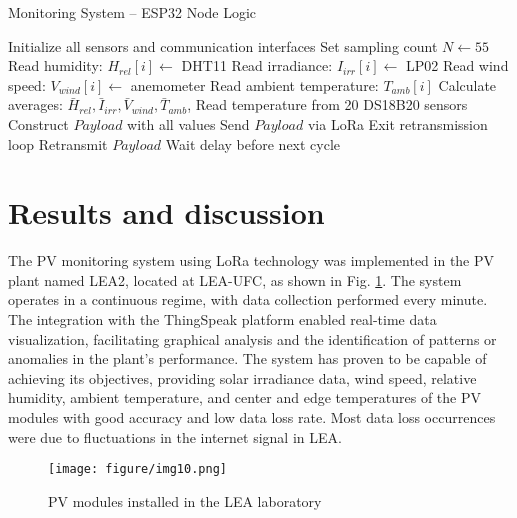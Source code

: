 \begin{algorithm}
\caption{Monitoring System – ESP32 Node Logic}
\begin{algorithmic}[1]
\STATE Initialize all sensors and communication interfaces
\LOOP
    \STATE Set sampling count $N \gets 55$
        \STATE Read humidity: $H_{rel}[i] \gets$ DHT11
        \STATE Read irradiance: $I_{irr}[i] \gets$ LP02
        \STATE Read wind speed: $V_{wind}[i] \gets$ anemometer
        \STATE Read ambient temperature: $T_{amb}[i]$
    \ENDFOR
    \STATE Calculate averages: $\bar{H}_{rel}, \bar{I}_{irr}, \bar{V}_{wind}, \bar{T}_{amb}$, 
    \STATE Read temperature from 20 DS18B20 sensors
    \STATE Construct $Payload$ with all values
    \STATE Send $Payload$ via LoRa
            \STATE Exit retransmission loop
        \ELSE
            \STATE Retransmit $Payload$
        \ENDIF
    \ENDFOR
    \STATE Wait delay before next cycle
\ENDLOOP
\end{algorithmic}
\end{algorithm}




\section{Results and discussion}
\label{sec:resul}


The PV monitoring system using LoRa technology was implemented in the PV plant named LEA2, located at LEA-UFC, as shown in Fig. \ref{fig:modulosLEA}. The system operates in a continuous regime, with data collection performed every minute. The integration with the ThingSpeak platform enabled real-time data visualization, facilitating graphical analysis and the identification of patterns or anomalies in the plant's performance. The system has proven to be capable of achieving its objectives, providing solar irradiance data, wind speed, relative humidity, ambient temperature, and center and edge temperatures of the PV modules with good accuracy and low data loss rate. Most data loss occurrences were due to fluctuations in the internet signal in LEA.

\begin{figure}[h]
    \centering
    \texttt{[image: figure/img10.png]}
    \caption{PV modules installed in the LEA laboratory}
    \label{fig:modulosLEA}
\end{figure}




